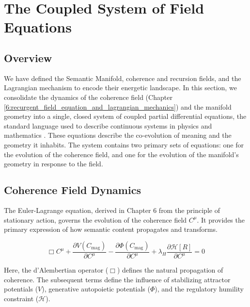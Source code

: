 \chapter{The Coupled System of Field Equations}
\label{10:the_coupled_system_of_field_equations}


\section{Overview}
\label{10.1:overview}

We have defined the Semantic Manifold, coherence and recursion fields, and the Lagrangian mechanism to encode their energetic landscape. In this section, we consolidate the dynamics of the coherence field (Chapter \ref{6:recurgent_field_equation_and_lagrangian_mechanics}) and the manifold geometry into a single, closed system of coupled partial differential equations, the standard language used to describe continuous systems in physics and mathematics \autocite{Evans2010}. These equations describe the co-evolution of meaning and the geometry it inhabits. The system contains two primary sets of equations: one for the evolution of the coherence field, and one for the evolution of the manifold's geometry in response to the field.


\section{Coherence Field Dynamics}
\label{10.2:coherence_field_dynamics}

The Euler-Lagrange equation, derived in Chapter 6 from the principle of stationary action, governs the evolution of the coherence field \(C^\mu\). It provides the primary expression of how semantic content propagates and transforms.

\begin{equation}
\Box C^\mu + \frac{\partial V(C_{\mathrm{mag}})}{\partial C^\mu} - \frac{\partial \Phi(C_{\mathrm{mag}})}{\partial C^\mu} + \lambda_H \frac{\partial \mathcal{H}[R]}{\partial C^\mu} = 0
\end{equation}

Here, the d'Alembertian operator (\(\Box\)) defines the natural propagation of coherence. The subsequent terms define the influence of stabilizing attractor potentials (\(V\)), generative autopoietic potentials (\(\Phi\)), and the regulatory humility constraint (\(\mathcal{H}\)).

